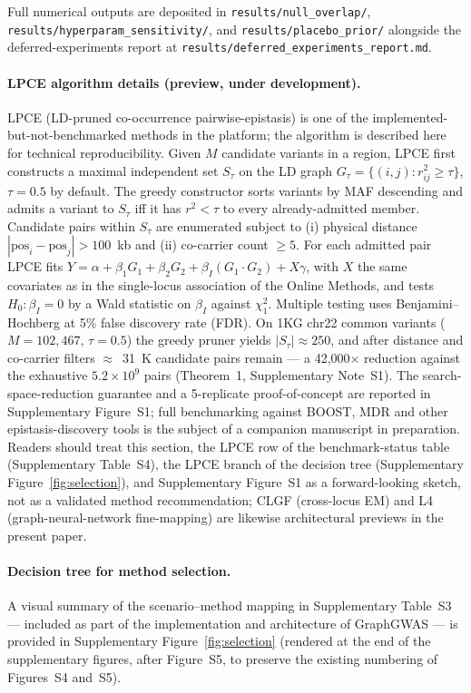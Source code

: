 Full numerical outputs are deposited in \texttt{results/null\_overlap/},
\texttt{results/hyperparam\_sensitivity/}, and
\texttt{results/placebo\_prior/} alongside the deferred-experiments
report at \texttt{results/deferred\_experiments\_report.md}.

\paragraph{LPCE algorithm details (preview, under development).}\label{snote:lpce}%
LPCE (LD-pruned co-occurrence pairwise-epistasis) is one of the
implemented-but-not-benchmarked methods in the platform; the
algorithm is described here for technical reproducibility.
Given $M$ candidate variants in a region, LPCE first constructs a
maximal independent set $S_\tau$ on the LD graph
$G_\tau = \{(i,j): r^2_{ij} \geq \tau\}$, $\tau = 0.5$ by default.
The greedy constructor sorts variants by MAF descending and admits
a variant to $S_\tau$ iff it has $r^2 < \tau$ to every
already-admitted member. Candidate pairs within $S_\tau$ are
enumerated subject to (i) physical distance
$|\text{pos}_i - \text{pos}_j| > 100$~kb and (ii) co-carrier count
$\geq 5$. For each admitted pair LPCE fits
$Y = \alpha + \beta_1 G_1 + \beta_2 G_2 + \beta_I (G_1 \cdot G_2) + X\gamma$,
with $X$ the same covariates as in the single-locus association
of the Online Methods, and tests $H_0: \beta_I = 0$ by a Wald
statistic on $\beta_I$ against $\chi^2_1$. Multiple testing uses
Benjamini--Hochberg at 5\% false discovery rate (FDR). On 1KG
chr22 common variants ($M = 102{,}467$, $\tau{=}0.5$) the greedy
pruner yields $|S_\tau| \approx 250$, and after distance and
co-carrier filters $\approx$~31~K candidate pairs remain --- a
42{,}000$\times$ reduction against the exhaustive
$5.2 \times 10^9$ pairs (Theorem~1, Supplementary Note~S1). The
search-space-reduction guarantee and a 5-replicate proof-of-concept
are reported in Supplementary Figure~S1; full benchmarking against
BOOST, MDR and other epistasis-discovery tools is the subject of a
companion manuscript in preparation. Readers should treat this
section, the LPCE row of the benchmark-status table
(Supplementary Table~S4), the LPCE branch of the decision tree
(Supplementary Figure~\ref{fig:selection}), and Supplementary
Figure~S1 as a forward-looking sketch, not as a validated method
recommendation; CLGF (cross-locus EM) and L4 (graph-neural-network
fine-mapping) are likewise architectural previews in the present
paper.

\paragraph{Decision tree for method selection.}
A visual summary of the scenario--method mapping in
Supplementary Table~S3 --- included as part of the implementation
and architecture of GraphGWAS --- is provided in Supplementary
Figure~\ref{fig:selection} (rendered at the end of the
supplementary figures, after Figure~S5, to preserve the existing
numbering of Figures~S4 and~S5).

